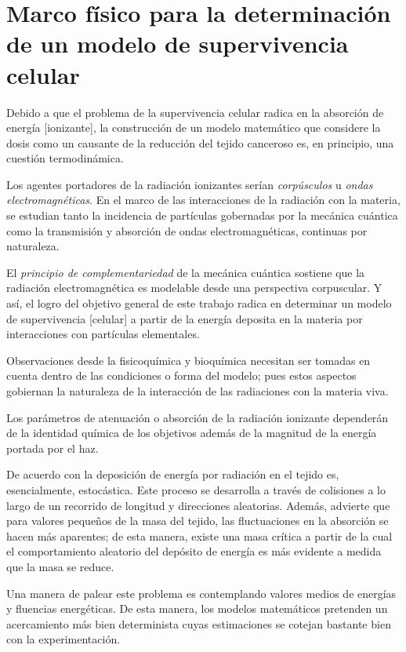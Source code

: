 \documentclass[12pt,letterpaper, oneside]{book}
\begin{document}
	\chapter{Marco físico para la determinación de un modelo de supervivencia celular}
	Debido a que el problema de la supervivencia celular radica en la absorción de energía [ionizante], la construcción de un modelo matemático que considere la dosis como un causante de la reducción del tejido canceroso es, en principio, una cuestión termodinámica. 
	
	Los agentes portadores de la radiación ionizantes serían \textit{corpúsculos} u \textit{ondas electromagnéticas}. En el marco de las interacciones de la radiación con la materia, se estudian tanto la incidencia de partículas gobernadas por la mecánica cuántica como la transmisión y absorción de ondas electromagnéticas, continuas por naturaleza.
	
	El \textit{principio de complementariedad} de la mecánica cuántica sostiene que la radiación electromagnética es modelable desde una perspectiva corpuscular. Y así, el logro del objetivo general de este trabajo radica en determinar un modelo de supervivencia [celular] a partir de la energía deposita en la materia por interacciones con partículas elementales. 
	
	Observaciones desde la fisicoquímica y bioquímica necesitan ser tomadas en cuenta dentro de las condiciones o forma del modelo; pues estos aspectos gobiernan la naturaleza de la interacción de las radiaciones con la materia viva\cite{Bleehen.2007}. 
	
	Los parámetros de atenuación o absorción de la radiación ionizante dependerán de la identidad química de los objetivos además de la magnitud de la energía portada por el haz\cite{Mayles.2007,IAEA.2005,Podgorsak.2016}.
	
	De acuerdo con \cite{Mayles.2007} la deposición de energía por radiación en el tejido es, esencialmente, estocástica. Este proceso se desarrolla a través de colisiones a lo largo de un recorrido de longitud y direcciones aleatorias. Además, \cite{Mayles.2007} advierte que para valores pequeños de la masa del tejido, las fluctuaciones en la absorción se hacen más aparentes; de esta manera, existe una masa crítica a partir de la cual el comportamiento aleatorio del depósito de energía es más evidente a medida que la masa se reduce.
	
	Una manera de palear este problema es contemplando valores medios de energías y fluencias energéticas\cite{Mayles.2007, Podgorsak.2016}. De esta manera, los modelos matemáticos pretenden un acercamiento más bien determinista cuyas estimaciones se cotejan bastante bien con la experimentación\cite{Podgorsak.2016}.  
	
\end{document}
